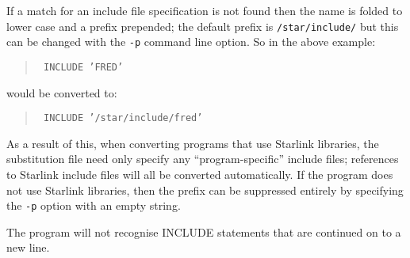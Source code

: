 If a match for an include file specification is not found then the name
is folded to lower case and a prefix prepended; the default prefix is
{\tt /star/include/} but this can be changed with the {\tt -p} command line
option. So in the above example:
\begin{quote}
{\tt
       INCLUDE 'FRED'}
\end{quote}
would be converted to:
\begin{quote}
{\tt 
      INCLUDE '/star/include/fred'}
\end{quote}
As a result of this,
when converting programs that use Starlink libraries, the substitution file
need only specify any ``program-specific'' include files; references to 
Starlink include files will all be converted automatically. If the
program does not use Starlink libraries, then the prefix can be suppressed
entirely by specifying the {\tt -p} option with an empty string.

The program will not recognise INCLUDE statements that are continued
on to a new line.

